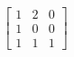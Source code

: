 \begin{displaymath}
 \begin{bmatrix}
  1 & 2 & 0 \\
  1 & 0 & 0 \\
  1 & 1 & 1 
 \end{bmatrix}
\end{displaymath}
